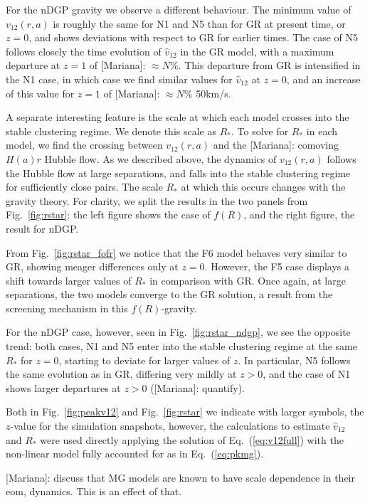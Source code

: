 \documentclass[%
 reprint,
groupedaddress,
nofootinbib,
nobibnotes,
 amsmath,amssymb,
 aps,
]{revtex4-2}
\newcommand{\refeq}[1]{Eq.~(\ref{eq:#1})}
\newcommand{\reffig}[1]{Fig.~\ref{fig:#1}}
\newcommand{\pairvel}{$v_{12}(r,a)$}
\newcommand{\<}{\langle}
\renewcommand{\>}{\rangle}
\newcommand{\MJ}[1]{\textcolor{WildStrawberry}{[Mariana]: #1}}
\begin{document}
For the nDGP gravity we observe a different behaviour. The minimum value of \pairvel{} is roughly the same for N1 and N5 than for GR at present time, or $z=0$, and shows deviations with respect to GR for earlier times. The case of N5 follows closely the time evolution of  $\hat{v}_{12}$ in the GR model, with a maximum departure at $z=1$ of \MJ{$\approx N\%$}.  This departure from GR is intensified in the N1 case, in which case we find similar values for  $\hat{v}_{12}$ at $z=0$, and an increase of this value for $z=1$ of \MJ{$\approx N\%$ 50km/s}. 


A separate interesting feature is the scale at which each model crosses into the stable clustering regime. We denote this scale as $R_*$. To solve for $R_*$ in each model, we find the crossing between \pairvel{} and the  \MJ{comoving} $H(a)r$ Hubble flow. As we described above, the dynamics of \pairvel{} follows the Hubble flow at large separations, and falls into the stable clustering regime for sufficiently close pairs. The scale $R_*$ at which this occurs changes with the gravity theory. For clarity, we split the results in the two panels from \reffig{rstar}: the left figure shows the case of $f(R)$, and the right figure, the result for nDGP.   

From \reffig{rstar_fofr} we notice that the F6 model behaves very similar to GR, showing meager differences only at $z=0$. However, the F5 case displays a shift  towards  larger values of $R_*$ in comparison with GR.  Once again, at large separations, the two models converge to the GR solution, a result from the screening mechanism in this $f(R)$-gravity. 

For the nDGP case, however, seen in \reffig{rstar_ndgp}, we see the opposite trend: both cases, N1 and N5 enter into the stable clustering regime at the same $R_*$ for $z=0$, starting to deviate for larger values of $z$. In particular, N5 follows the same evolution as in GR, differing very mildly at $z>0$, and the case of N1 shows larger departures at $z>0$ (\MJ{quantify}). 

Both in  \reffig{peakv12} and \reffig{rstar} we indicate with larger symbols, the $z$-value for the simulation snapshots, however, the calculations to estimate $\hat{v}_{12}$ and $R_*$ were used directly applying the solution of \refeq{v12full} with the non-linear model fully accounted for as in \refeq{pkmg}.

\MJ{discuss that MG models are known to have scale dependence in their eom, dynamics. This is an effect of that. }
\end{document}
